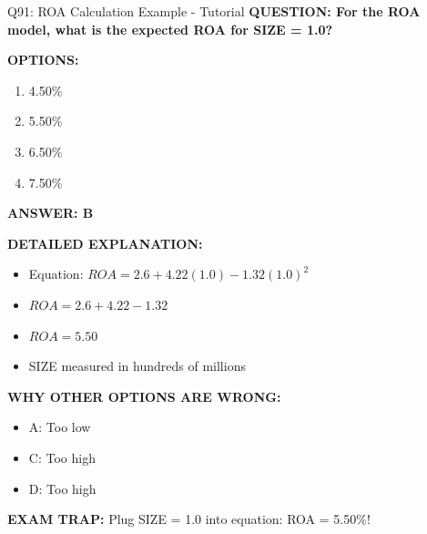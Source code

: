 \documentclass[8pt]{beamer}
\begin{document}
	\begin{frame}{Q91: ROA Calculation Example - Tutorial}
		\fontsize{6.5}{7.5}\selectfont
		\textbf{QUESTION: For the ROA model, what is the expected ROA for SIZE = 1.0?}
		
		\vspace{0.1cm}
		\textbf{OPTIONS:}
		\begin{enumerate}
			\item 4.50\%
			\item 5.50\%
			\item 6.50\%
			\item 7.50\%
		\end{enumerate}
		
		\vspace{0.1cm}
		\textcolor{myblue}{\textbf{ANSWER: B}}
		
		\vspace{0.1cm}
		\textbf{DETAILED EXPLANATION:}
		\begin{itemize}
			\item Equation: $ROA = 2.6 + 4.22(1.0) - 1.32(1.0)^2$
			\item $ROA = 2.6 + 4.22 - 1.32$
			\item $ROA = 5.50$
			\item SIZE measured in hundreds of millions
		\end{itemize}
		
		\vspace{0.1cm}
		\textcolor{myred}{\textbf{WHY OTHER OPTIONS ARE WRONG:}}
		\begin{itemize}
			\item \textcolor{myred}{A:} Too low
			\item \textcolor{myred}{C:} Too high
			\item \textcolor{myred}{D:} Too high
		\end{itemize}
		
		\textcolor{myred}{\textbf{EXAM TRAP:}} Plug SIZE = 1.0 into equation: \textcolor{myblue}{ROA = 5.50\%}!
	\end{frame}
	
\end{document}
